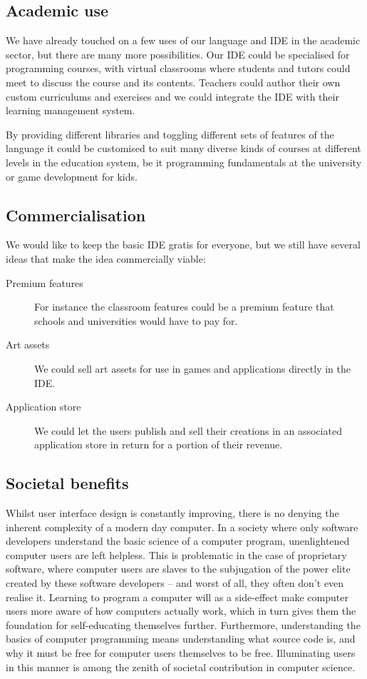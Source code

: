 \subsection{Academic use}

We have already touched on a few uses of our language and IDE in the academic
sector, but there are many more possibilities.
Our IDE could be specialised for programming courses, with virtual classrooms
where students and tutors could meet to discuss the course and its contents.
Teachers could author their own custom curriculums and exercises and we could
integrate the IDE with their learning management system.

By providing different libraries and toggling different sets of features of the
language it could be customised to suit many diverse kinds of courses at
different levels in the education system, be it programming fundamentals at the
university or game development for kids.

\subsection{Commercialisation}

We would like to keep the basic IDE gratis for everyone, but we still have
several ideas that make the idea commercially viable:

\begin{description}
  \item[Premium features]
    For instance the classroom features could be a premium feature that schools
    and universities would have to pay for.
  \item[Art assets]
    We could sell art assets for use in games and applications directly in the
    IDE.
  \item[Application store]
    We could let the users publish and sell their creations in an associated
    application store in return for a portion of their revenue.
\end{description}

\subsection{Societal benefits}
Whilst user interface design is constantly improving, there is no denying the 
inherent complexity of a modern day computer. In a society where only software 
developers understand the basic science of a computer program, unenlightened 
computer users are left helpless. This is problematic in the case of 
proprietary software, where computer users are slaves to the subjugation of 
the power elite created by these software developers -- and worst of all, they 
often don't even realise it. Learning to program a computer will as a 
side-effect make computer users more aware of how computers actually work, 
which in turn gives them the foundation for self-educating themselves further. 
Furthermore, understanding the basics of computer programming means 
understanding what source code is, and why it must be free for computer users 
themselves to be free. Illuminating users in this manner is among the zenith 
of societal contribution in computer science.

